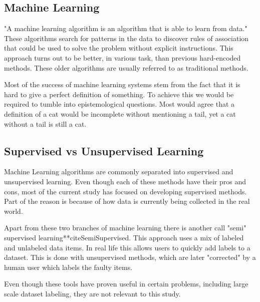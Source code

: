 \documentclass{book}
\begin{document}
\begin{appendices}
\chapter{Machine Learning}
\qquad "A machine learning algorithm is an algorithm that is able to learn from data."\cite{DeepLearning}
These algorithms search for patterns in the data to discover rules of association that could be used to solve the problem without explicit instructions.
This approach turns out to be better, in various task, than previous hard-encoded methods.
These older algorithms are usually referred to as traditional methods.
\par
Most of the success of machine learning systems stem from the fact that it is hard to give a perfect definition of something.
To achieve this we would be required to tumble into epistemological questions.
Most would agree that a definition of a cat would be incomplete without mentioning a tail, yet a cat without a tail is still a cat.
\section{Supervised vs Unsupervised Learning}
\qquad Machine Learning algorithms are commonly separated into supervised and unsupervised learning.
Even though each of these methods have their pros and cons, most of the current study has focused on developing supervised methods.
Part of the reason is because of how data is currently being collected in the real world.
\par
Apart from these two branches of machine learning there is another call "semi" supervised learning**cite{SemiSupervised}.
This approach uses a mix of labeled and unlabeled data items.
In real life this allows users to quickly add labels to a dataset.
This is done with unsupervised methods, which are later "corrected" by a human user which labels the faulty items. 
\par
Even though these tools have proven useful in certain problems, including large scale dataset labeling, they are not relevant to this study.

\end{appendices}
\end{document}
